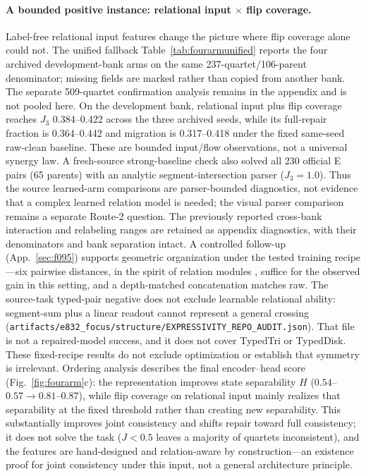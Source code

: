 \paragraph{A bounded positive instance: relational input $\times$ flip
coverage.} Label-free relational input features change the picture where
flip coverage alone could not. The unified fallback
Table~\ref{tab:fourarmunified} reports the four archived development-bank
arms on the same 237-quartet/106-parent denominator; missing fields are
marked rather than copied from another bank. The separate 509-quartet
confirmation analysis remains in the appendix and is not pooled here.
On the development bank, relational input plus flip coverage reaches
$J_3$ 0.384--0.422 across the three archived seeds, while its full-repair
fraction is 0.364--0.442 and migration is 0.317--0.418 under the fixed
same-seed raw-clean baseline. These are bounded input/flow observations,
not a universal synergy law. A fresh-source strong-baseline check also
solved all 230 official E pairs (65 parents) with an analytic
segment-intersection parser ($J_3=1.0$). Thus the source learned-arm
comparisons are parser-bounded diagnostics, not evidence that a complex
learned relation model is needed; the visual parser comparison remains a
separate Route-2 question. The previously reported cross-bank interaction
and relabeling ranges are retained as appendix diagnostics, with their
denominators and bank separation intact.
A controlled follow-up
(App.~\ref{sec:f095}) supports geometric organization under the tested training recipe---six
pairwise distances, in the spirit of relation modules \citep{santoro2017simple}, suffice for the observed gain in this setting, and a depth-matched concatenation matches raw. The source-task typed-pair negative does not exclude learnable relational ability: segment-sum plus a linear readout cannot represent a general crossing (\texttt{artifacts/e832\_focus/structure/EXPRESSIVITY\_REPO\_AUDIT.json}). That file is not a repaired-model success, and it does not cover TypedTri or TypedDisk. These fixed-recipe results do not exclude optimization or establish that symmetry is irrelevant. Ordering analysis describes the final encoder--head score (Fig.~\ref{fig:fourarm}c):
the representation improves state separability $H$ ($0.54$--$0.57 \to
0.81$--$0.87$), while flip coverage on relational input mainly realizes
that separability at the fixed threshold rather than creating new
separability. This substantially improves joint consistency
and shifts repair toward full consistency; it does not solve the task
($J < 0.5$ leaves a majority of quartets inconsistent), and the features
are hand-designed and relation-aware by construction---an existence proof
for joint consistency under this input, not a general architecture
principle.

